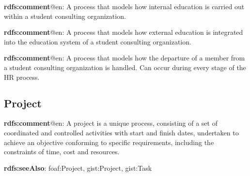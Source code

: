 \documentclass[a4paper, DIV=13, BCOR=0cm]{scrbook}
\begin{document}
\begin{mdframed}[style=onto-4, frametitle={Internal Education Process}]
	{%
		\begin{compactitem}
			\item \textbf{rdfs:comment}@en: A process that models how internal education is carried out within a student consulting organization.
		\end{compactitem}
	} %
\end{mdframed}

\begin{mdframed}[style=onto-4, frametitle={External Education Process}]
	{%
		\begin{compactitem}
			\item \textbf{rdfs:comment}@en: A process that models how external education is integrated into the education system of a student consulting organization.
		\end{compactitem}
	} %
\end{mdframed}

\begin{mdframed}[style=onto-2, frametitle={Offboarding Process}]
	{%
		\begin{compactitem}
			\item \textbf{rdfs:comment}@en: A process that models how the departure of a member from a student consulting organization is handled. Can occur during every stage of the HR process.
		\end{compactitem}
	} %
\end{mdframed}

\subsection{Project}
\begin{mdframed}[style=onto, frametitle={Project}]
	{%
		\begin{compactitem}
			\item \textbf{rdfs:comment}@en: A project is a unique process, consisting of a set of coordinated and controlled activities with start and finish dates, undertaken to achieve an objective conforming to specific requirements, including the constraints of time, cost and resources. \cite{iso-9000-2015}
			\item \textbf{rdfs:seeAlso}: foaf:Project, gist:Project, gist:Task
		\end{compactitem}
	} %
\end{mdframed}
\end{document}
